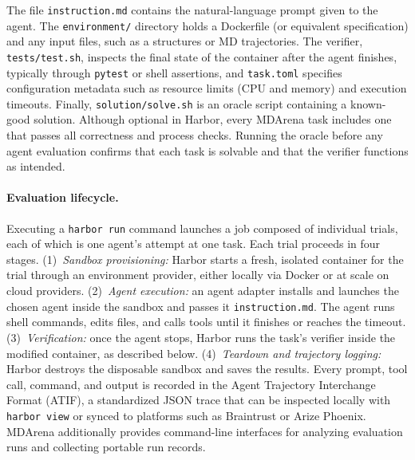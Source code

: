 \noindent The file \texttt{instruction.md} contains the natural-language prompt given to the agent. The \texttt{environment/} directory holds a Dockerfile (or equivalent specification) and any input files, such as a structures or MD trajectories. The verifier, \texttt{tests/test.sh}, inspects the final state of the container after the agent finishes, typically through \texttt{pytest} or shell assertions, and \texttt{task.toml} specifies configuration metadata such as resource limits (CPU and memory) and execution timeouts. Finally, \texttt{solution/solve.sh} is an oracle script containing a known-good solution. Although optional in Harbor, every MDArena task includes one that passes all correctness and process checks. Running the oracle before any agent evaluation confirms that each task is solvable and that the verifier functions as intended.

\paragraph{Evaluation lifecycle.}
Executing a \texttt{harbor run} command launches a job composed of individual trials, each of which is one agent's attempt at one task. Each trial proceeds in four stages. (1)~\emph{Sandbox provisioning:} Harbor starts a fresh, isolated container \cite{moreau2023containers} for the trial through an environment provider, either locally via Docker or at scale on cloud providers. (2)~\emph{Agent execution:} an agent adapter installs and launches the chosen agent inside the sandbox and passes it \texttt{instruction.md}. The agent runs shell commands, edits files, and calls tools until it finishes or reaches the timeout. (3)~\emph{Verification:} once the agent stops, Harbor runs the task's verifier inside the modified container, as described below. (4)~\emph{Teardown and trajectory logging:} Harbor destroys the disposable sandbox and saves the results. Every prompt, tool call, command, and output is recorded in the Agent Trajectory Interchange Format (ATIF), a standardized JSON trace that can be inspected locally with \texttt{harbor view} or synced to platforms such as Braintrust or Arize Phoenix. MDArena additionally provides command-line interfaces for analyzing evaluation runs and collecting portable run records.

